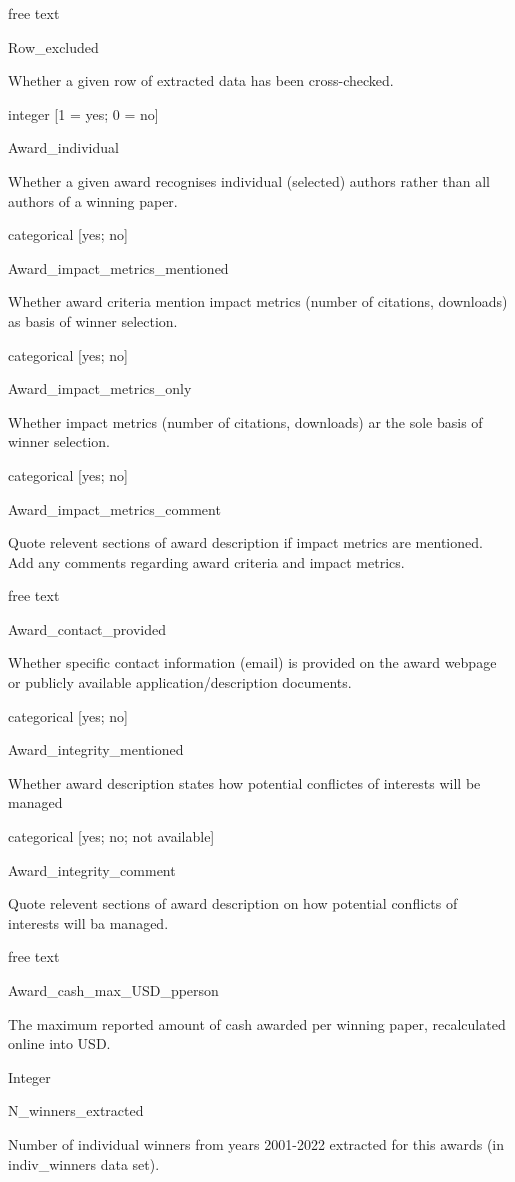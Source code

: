 \documentclass[
]{article}
\begin{document}
free text

Row\_excluded

Whether a given row of extracted data has been cross-checked.

integer {[}1 = yes; 0 = no{]}

Award\_individual

Whether a given award recognises individual (selected) authors rather
than all authors of a winning paper.

categorical {[}yes; no{]}

Award\_impact\_metrics\_mentioned

Whether award criteria mention impact metrics (number of citations,
downloads) as basis of winner selection.

categorical {[}yes; no{]}

Award\_impact\_metrics\_only

Whether impact metrics (number of citations, downloads) ar the sole
basis of winner selection.

categorical {[}yes; no{]}

Award\_impact\_metrics\_comment

Quote relevent sections of award description if impact metrics are
mentioned. Add any comments regarding award criteria and impact metrics.

free text

Award\_contact\_provided

Whether specific contact information (email) is provided on the award
webpage or publicly available application/description documents.

categorical {[}yes; no{]}

Award\_integrity\_mentioned

Whether award description states how potential conflictes of interests
will be managed

categorical {[}yes; no; not available{]}

Award\_integrity\_comment

Quote relevent sections of award description on how potential conflicts
of interests will ba managed.

free text

Award\_cash\_max\_USD\_pperson

The maximum reported amount of cash awarded per winning paper,
recalculated online into USD.

Integer

N\_winners\_extracted

Number of individual winners from years 2001-2022 extracted for this
awards (in indiv\_winners data set).
\end{document}
